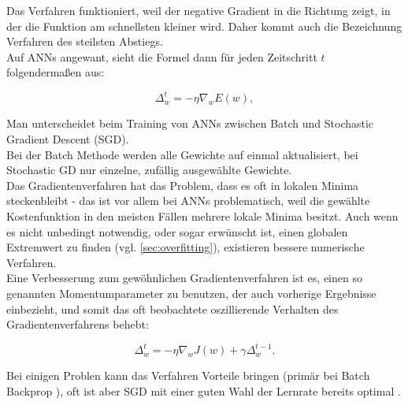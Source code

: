 Das Verfahren funktioniert, weil der negative Gradient in die Richtung zeigt, in der die Funktion am schnellsten kleiner wird. Daher kommt auch die Bezeichnung Verfahren des steilsten Abstiegs.\\


Auf ANNs angewant, sieht die Formel dann für jeden Zeitschritt $t$ folgendermaßen aus:

\begin{equation}
  \Delta_w^t = - \eta  \nabla_w E(w),
\end{equation}





Man unterscheidet beim Training von ANNs zwischen Batch und Stochastic Gradient Descent (SGD).\\

Bei der Batch Methode werden alle Gewichte auf einmal aktualisiert, bei Stochastic GD nur einzelne, zufällig ausgewählte Gewichte.\\

Das Gradientenverfahren hat das Problem, dass es oft in lokalen Minima steckenbleibt - das ist vor allem bei ANNs problematisch, weil die gewählte Kostenfunktion in den meisten Fällen mehrere lokale Minima besitzt. Auch wenn es nicht unbedingt notwendig, oder sogar erwünscht ist, einen globalen Extremwert zu finden (vgl. \ref{sec:overfitting}), existieren bessere numerische Verfahren. \\

Eine Verbesserung zum gewöhnlichen Gradientenverfahren ist es, einen so genannten Momentumparameter zu benutzen, der auch vorherige Ergebnisse einbezieht, und somit das oft beobachtete oszillierende Verhalten des Gradientenverfahrens behebt:

\begin{equation}
 \Delta_w^t = - \eta  \nabla_w J(w) + \gamma \Delta_w^{t-1}.
\end{equation}

Bei einigen Problen kann das Verfahren Vorteile bringen (primär bei Batch Backprop \cite{lecunefficient}), oft ist aber SGD mit einer guten Wahl der Lernrate bereits optimal \cite{bengio2012practical}.
